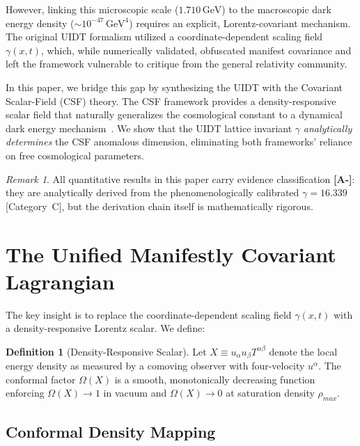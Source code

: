 \documentclass[12pt,a4paper,twoside]{article}
\theoremstyle{plain}
\theoremstyle{definition}
\newtheorem{definition}[theorem]{Definition}
\theoremstyle{remark}
\newtheorem{remark}[theorem]{Remark}
\newcommand{\UIDT}{\textsc{UIDT}}
\newcommand{\CSF}{\textsc{CSF}}
\newcommand{\GeV}{\,\mathrm{GeV}}
\begin{document}
However, linking this microscopic scale ($1.710\GeV$) to the macroscopic dark
energy density ($\sim 10^{-47}\GeV^4$) requires an explicit, Lorentz-covariant
mechanism. The original \UIDT{} formalism utilized a coordinate-dependent
scaling field $\gamma(x,t)$, which, while numerically validated, obfuscated
manifest covariance and left the framework vulnerable to critique from the
general relativity community.

In this paper, we bridge this gap by synthesizing the \UIDT{} with the
Covariant Scalar-Field (\CSF{}) theory. The \CSF{} framework provides a
density-responsive scalar field that naturally generalizes the cosmological
constant to a dynamical dark energy mechanism~\cite{Barrow2020}. We show that
the \UIDT{} lattice invariant $\gamma$ \emph{analytically determines} the
\CSF{} anomalous dimension, eliminating both frameworks' reliance on free
cosmological parameters.

\begin{remark}
All quantitative results in this paper carry evidence classification
\textcolor{catAminus}{\textbf{[A-]}}: they are analytically derived from the
phenomenologically calibrated $\gamma = 16.339$ [Category~C], but the
derivation chain itself is mathematically rigorous.
\end{remark}


\section{The Unified Manifestly Covariant Lagrangian}
\label{sec:lagrangian}

The key insight is to replace the coordinate-dependent scaling field
$\gamma(x,t)$ with a density-responsive Lorentz scalar. We define:

\begin{definition}[Density-Responsive Scalar]
\label{def:density_scalar}
Let $X \equiv u_\alpha u_\beta T^{\alpha\beta}$ denote the local energy
density as measured by a comoving observer with four-velocity $u^\alpha$.
The conformal factor $\Omega(X)$ is a smooth, monotonically decreasing
function enforcing $\Omega(X) \to 1$ in vacuum and $\Omega(X) \to 0$ at
saturation density $\rho_{max}$.
\end{definition}

\subsection{Conformal Density Mapping}
\end{document}
